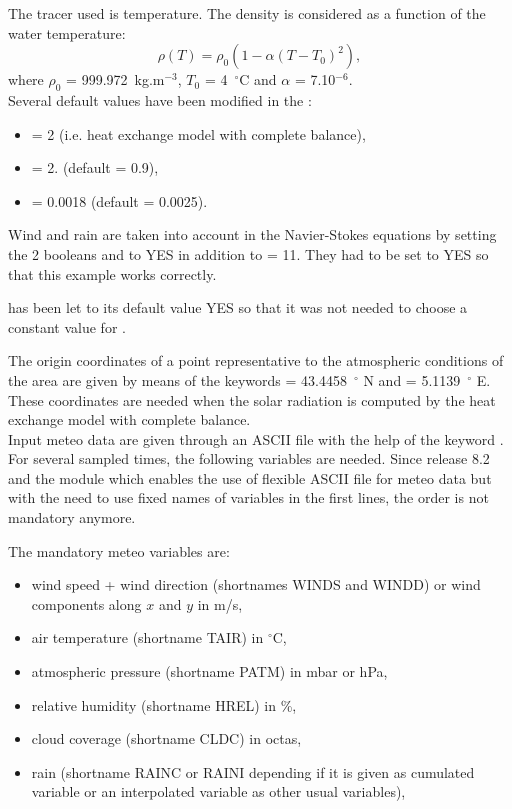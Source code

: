 The tracer used is temperature.
%
The density is considered as a function of the water temperature:
\begin{equation}
  \rho(T) = \rho_0 \left(1 - \alpha (T-T_0)^2\right),
\end{equation}
where $\rho_0$ = 999.972~kg.m$^{-3}$, $T_0$ = 4~$^{\circ}$C
and $\alpha$ = 7.10$^{-6}$.\\

Several default values have been modified in the \waqtel {}:
\begin{itemize}
\item {} = 2 (i.e. heat exchange model
with complete balance),
\item {} = 2. (default = 0.9),
\item {} =
0.0018 (default = 0.0025).
\end{itemize}

Wind and rain are taken into account in the Navier-Stokes equations
by setting the 2 booleans  and  to YES
in addition to  = 11.
They had to be set to YES so that this example works correctly.

 has been let to
its default value YES so that it was not needed to choose a constant value for
.

The origin coordinates of a point representative to the atmospheric conditions
of the area are given by means of the keywords
 = 43.4458~$^{\circ}$ N and
 = 5.1139~$^{\circ}$ E.
These coordinates are needed when the solar radiation is computed by the heat
exchange model with complete balance.\\

Input meteo data are given through an ASCII file with the help of the keyword
.
For several sampled times, the following variables are needed.
Since release 8.2 and the module  which enables the use
of flexible ASCII file for meteo data but with the need to use
fixed names of variables in the first lines, the order is not mandatory anymore.

The mandatory meteo variables are:
\begin{itemize}
\item wind speed + wind direction (shortnames WINDS and WINDD) or wind
  components along $x$ and $y$ in m/s,
\item air temperature (shortname TAIR) in $^{\circ}$C,
\item atmospheric pressure (shortname PATM) in mbar or hPa,
\item relative humidity (shortname HREL) in \%, 
\item cloud coverage (shortname CLDC) in octas,
\item rain (shortname RAINC or RAINI depending if it is given as cumulated
  variable or an interpolated variable as other usual variables),
\end{itemize}

